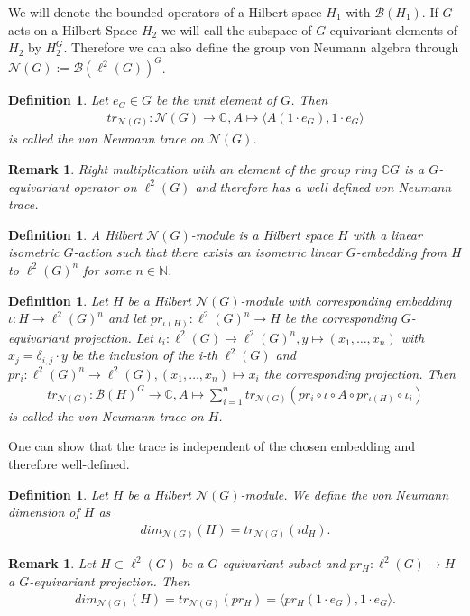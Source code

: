 \documentclass[12pt,a4paper]{scrartcl}
\newtheorem{Definition}[Theorem]{Definition}
\newtheorem{Remark}[Theorem]{Remark}
\numberwithin{equation}{section}
\newcommand{\C}{\mathbb{C}} %
\newcommand{\N}{\mathbb{N}} %
\newcommand{\2}{\mathbb{Z} / 2 \mathbb{Z}}
\newcommand{\1}{\bar{1}}
\newcommand{\0}{\bar{0}}
\begin{document}
We will denote the bounded operators of a Hilbert space $H_1$ with $\mathcal{B}(H_1)$. If $G$ acts on a Hilbert Space $H_2$ we will call the subspace of $G$-equivariant elements of $H_2$ by $H_2^G$. Therefore we can also define the group von Neumann algebra through $\mathcal{N}(G) := \mathcal{B}(\ell^2(G))^G$.
\begin{Definition}
	Let $e_G \in G$ be the unit element of $G$. Then
	\begin{align*}
		tr_{\mathcal{N}(G)}: \mathcal{N}(G) \to \C, A  \mapsto \langle A(1 \cdot e_G), 1 \cdot e_G \rangle
	\end{align*}
	is called the \emph{von Neumann trace} on $\mathcal{N}(G)$.
\end{Definition}
\begin{Remark}
	Right multiplication with an element of the group ring $\C G$ is a $G$-equivariant operator on $\ell^2(G)$ and therefore has a well defined von Neumann trace.
\end{Remark}
\begin{Definition}
	A \emph{Hilbert $\mathcal{N}(G)$-module} is a Hilbert space $H$ with a linear isometric $G$-action such that there exists an isometric linear $G$-embedding from $H$ to $\ell^2(G)^n$ for some $n \in \N$.
\end{Definition}
\begin{Definition}
	Let $H$ be a Hilbert $\mathcal{N}(G)$-module with corresponding embedding $\iota: H \to \ell^2(G)^n$ and let $pr_{\iota(H)}: \ell^2(G)^n \to H$ be the corresponding $G$-equivariant projection. Let $\iota_i: \ell^2(G) \to \ell^2(G)^n, y \mapsto (x_1, \ldots, x_n)$ with $x_j = \delta_{i,j} \cdot y$ be the inclusion of the i-th $\ell^2(G)$ and $pr_i: \ell^2(G)^n \to \ell^2(G), (x_1, \ldots, x_n) \mapsto x_i$ the corresponding projection. Then 
	\begin{align*}
		tr_{\mathcal{N}(G)}: \mathcal{B}(H)^G \to \C, A \mapsto \sum_{i = 1}^{n} tr_{\mathcal{N}(G)}(pr_i \circ \iota \circ A \circ pr_{\iota(H)} \circ \iota_i)
	\end{align*}
	is called the \emph{von Neumann trace} on $H$.
\end{Definition}
One can show that the trace is independent of the chosen embedding and therefore well-defined.
\begin{Definition}
	Let $H$ be a Hilbert $\mathcal{N}(G)$-module. We define the \emph{von Neumann dimension} of $H$ as
	\begin{align*}
		dim_{\mathcal{N}(G)}(H) = tr_{\mathcal{N}(G)}(id_H).
	\end{align*}
\end{Definition}
\begin{Remark}
	Let $H \subset \ell^2(G)$ be a $G$-equivariant subset and $pr_H: \ell^2(G) \to H$ a $G$-equivariant projection. Then\begin{align*}
	dim_{\mathcal{N}(G)}(H) = tr_{\mathcal{N}(G)}(pr_H) = \langle pr_H (1 \cdot e_G), 1 \cdot e_G \rangle.
	\end{align*}
\end{Remark}
\end{document}
